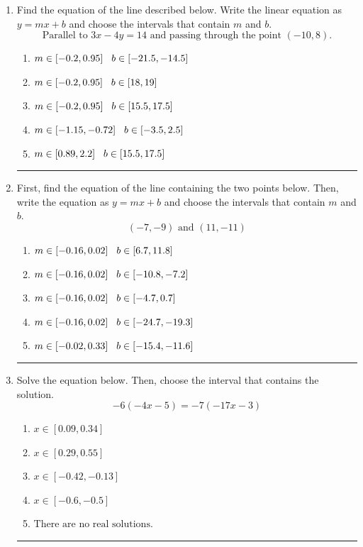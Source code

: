 \documentclass[14pt]{extbook}
\newcommand{\litem}[1]{\item#1\hspace*{-1cm}\rule{\textwidth}{0.4pt}}
\begin{document}
\begin{enumerate}
\litem{
Find the equation of the line described below. Write the linear equation as $ y=mx+b $ and choose the intervals that contain $m$ and $b$.\[ \text{Parallel to } 3 x - 4 y = 14 \text{ and passing through the point } (-10, 8). \]\begin{enumerate}[label=\Alph*.]
\item \( m \in [-0.2, 0.95] \hspace*{3mm} b \in [-21.5, -14.5] \)
\item \( m \in [-0.2, 0.95] \hspace*{3mm} b \in [18, 19] \)
\item \( m \in [-0.2, 0.95] \hspace*{3mm} b \in [15.5, 17.5] \)
\item \( m \in [-1.15, -0.72] \hspace*{3mm} b \in [-3.5, 2.5] \)
\item \( m \in [0.89, 2.2] \hspace*{3mm} b \in [15.5, 17.5] \)

\end{enumerate} }
\litem{
First, find the equation of the line containing the two points below. Then, write the equation as $ y=mx+b $ and choose the intervals that contain $m$ and $b$.\[ (-7, -9) \text{ and } (11, -11) \]\begin{enumerate}[label=\Alph*.]
\item \( m \in [-0.16, 0.02] \hspace*{3mm} b \in [6.7, 11.8] \)
\item \( m \in [-0.16, 0.02] \hspace*{3mm} b \in [-10.8, -7.2] \)
\item \( m \in [-0.16, 0.02] \hspace*{3mm} b \in [-4.7, 0.7] \)
\item \( m \in [-0.16, 0.02] \hspace*{3mm} b \in [-24.7, -19.3] \)
\item \( m \in [-0.02, 0.33] \hspace*{3mm} b \in [-15.4, -11.6] \)

\end{enumerate} }
\litem{
Solve the equation below. Then, choose the interval that contains the solution.\[ -6(-4x -5) = -7(-17x -3) \]\begin{enumerate}[label=\Alph*.]
\item \( x \in [0.09, 0.34] \)
\item \( x \in [0.29, 0.55] \)
\item \( x \in [-0.42, -0.13] \)
\item \( x \in [-0.6, -0.5] \)
\item \( \text{There are no real solutions.} \)


\end{enumerate}}
\end{enumerate}
\end{document}
